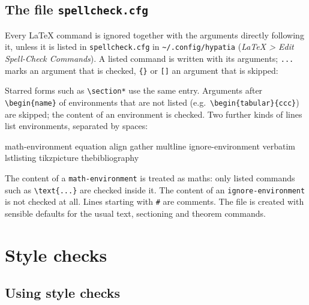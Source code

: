 \documentclass[11pt]{article}
\newcommand{\menu}[1]{\textsf{\textit{#1}}}
\newcommand{\file}[1]{\texttt{#1}}
\newcommand{\cfgdir}{\texttt{\textasciitilde/.config/hypatia}}
\begin{document}
    \subsection{The file \file{spellcheck.cfg}}

    Every LaTeX command is ignored together with the arguments directly following it, unless it is listed in \file{spellcheck.cfg} in \cfgdir{} (\menu{LaTeX > Edit Spell-Check Commands}). A listed command is written with its arguments; \verb+...+ marks an argument that is checked, \verb+{}+ or \verb+[]+ an argument that is skipped:
    Starred forms such as \verb+\section*+ use the same entry. Arguments after \verb+\begin{name}+ of environments that are not listed (e.g.\ \verb+\begin{tabular}{ccc}+) are skipped; the content of an environment is checked. Two further kinds of lines list environments, separated by spaces:
    \begin{Code}
math-environment equation align gather multline
ignore-environment verbatim lstlisting tikzpicture thebibliography
    \end{Code}
    The content of a \verb+math-environment+ is treated as maths: only listed commands such as \verb+\text{...}+ are checked inside it. The content of an \verb+ignore-environment+ is not checked at all. Lines starting with \verb+#+ are comments. The file is created with sensible defaults for the usual text, sectioning and theorem commands.


    \section{Style checks}\label{sec:style}

    \subsection{Using style checks}
\end{document}
